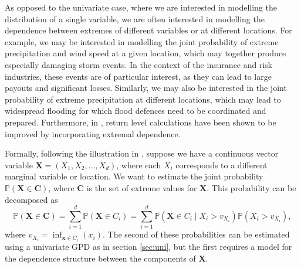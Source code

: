 \documentclass{article}
\numberwithin{equation}{section}
\begin{document}

As opposed to the univariate case, where we are interested in modelling the distribution of a single variable, we are often interested in modelling the dependence between extremes of different variables or at different locations.
For example, we may be interested in modelling the joint probability of extreme precipitation and wind speed at a given location, which may together produce especially damaging storm events.
In the context of the insurance and risk industries, these events are of particular interest, as they can lead to large payouts and significant losses.
Similarly, we may also be interested in the joint probability of extreme precipitation at different locations, which may lead to widespread flooding for which flood defences need to be coordinated and prepared.
Furthermore, in \citet{Zhang2024}, return level calculations have been shown to be improved by incorporating extremal dependence.

Formally, following the illustration in \citet{Heffernan2004}, suppose we have a continuous vector variable $\bm{X} = (X_1, X_2, \ldots, X_d)$, where each $X_i$ corresponds to a different marginal variable or location.
We want to estimate the joint probability $\mathbb{P}(\bm{X} \in \bm{C})$, where $\bm{C}$ is the set of extreme values for $\bm{X}$.
This probability can be decomposed as
\begin{equation} \label{eq:decomp}
  \mathbb{P}(\bm{X} \in \bm{C}) = \sum_{i=1}^{d}{\mathbb{P}(\bm{X} \in C_i)} = \sum_{i=1}^{d}{\mathbb{P}(\bm{X} \in C_i \mid X_i > v_{X_i}) \mathbb{P}(X_i > v_{X_i})},
\end{equation}
where $v_{X_i} = \inf_{\bm{x} \in C_i}(x_i)$.
The second of these probabilities can be estimated using a univariate GPD as in section \ref{sec:uni}, but the first requires a model for the dependence structure between the components of $\bm{X}$.
\end{document}
